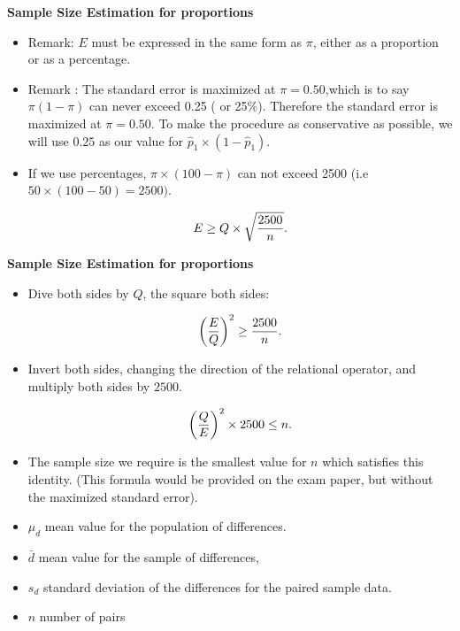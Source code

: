 \documentclass[]{report}
\begin{document}

\newpage






\textbf{Sample Size Estimation for proportions}
\begin{itemize}
\item Remark: $E$ must be expressed in the same form as $\pi$, either as a proportion or as a percentage.
\item Remark : The standard error is maximized at $\pi = 0.50$,which is to say $\pi(1-\pi)$ can never exceed 0.25 ( or 25\%). Therefore the standard error is maximized at $\pi = 0.50$. To make the procedure as conservative as possible, we will use $0.25$ as our value for $\hat{p}_1 \times (1 - \hat{p}_1)$.
\item If we use percentages, $\pi \times (100-\pi)$ can not exceed 2500 (i.e $ 50 \times (100-50)=2500)$.

\[ E \geq Q \times \sqrt{{2500 \over n}}. \]


\end{itemize}



\textbf{Sample Size Estimation for proportions}

\begin{itemize}

\item Dive both sides by $Q$, the square both sides:

\[ \left({E\over Q}\right)^2 \geq {2500 \over n}. \]

\item Invert both sides, changing the direction of the relational operator, and multiply both sides by $2500$.

\[ \left({Q\over E}\right)^2 \times 2500 \leq n. \]

\item The sample size we require is the smallest value for $n$ which satisfies this identity. (This formula would be provided on the exam paper, but without the maximized standard error).
\end{itemize}




{
\begin{itemize}
\item $\mu_d$ mean value for the population of differences.
\item $\bar{d}$ mean value for the sample of differences,
\item $s_d$ standard deviation of the differences for the paired sample data.
\item $n$ number of pairs
\end{itemize}


}
\end{document}
